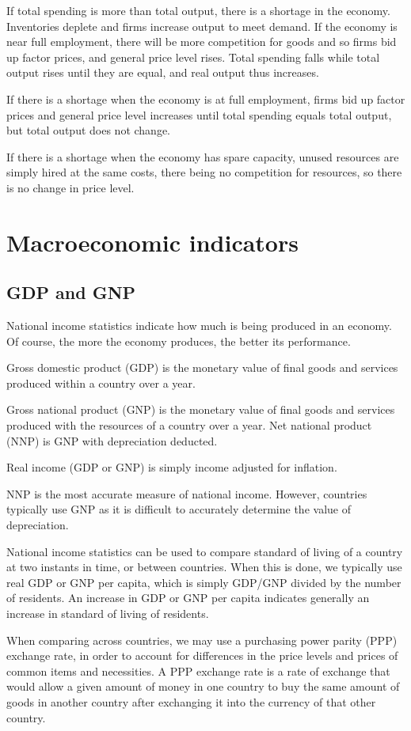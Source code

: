 \documentclass[Economics.tex]{subfiles}
\begin{document}
If total spending is more than total output, there is a shortage in the economy. Inventories deplete and firms increase output to meet demand. If the economy is near full employment, there will be more competition for goods and so firms bid up factor prices, and general price level rises. Total spending falls while total output rises until they are equal, and real output thus increases.

If there is a shortage when the economy is at full employment, firms bid up factor prices and general price level increases until total spending equals total output, but total output does not change.

If there is a shortage when the economy has spare capacity, unused resources are simply hired at the same costs, there being no competition for resources, so there is no change in price level.
\section{Macroeconomic indicators}
\subsection{GDP and GNP}
National income statistics indicate how much is being produced in an economy. Of course, the more the economy produces, the better its performance.

Gross domestic product (GDP) is the monetary value of final goods and services produced within a country over a year.

Gross national product (GNP) is the monetary value of final goods and services produced with the resources of a country over a year. Net national product (NNP) is GNP with depreciation deducted.

Real income (GDP or GNP) is simply income adjusted for inflation.

NNP is the most accurate measure of national income. However, countries typically use GNP as it is difficult to accurately determine the value of depreciation.

National income statistics can be used to compare standard of living of a country at two instants in time, or between countries. When this is done, we typically use real GDP or GNP per capita, which is simply GDP\slash{}GNP divided by the number of residents. An increase in GDP or GNP per capita indicates generally an increase in standard of living of residents.

When comparing across countries, we may use a purchasing power parity (PPP) exchange rate, in order to account for differences in the price levels and prices of common items and necessities. A PPP exchange rate is a rate of exchange that would allow a given amount of money in one country to buy the same amount of goods in another country after exchanging it into the currency of that other country.
\end{document}
